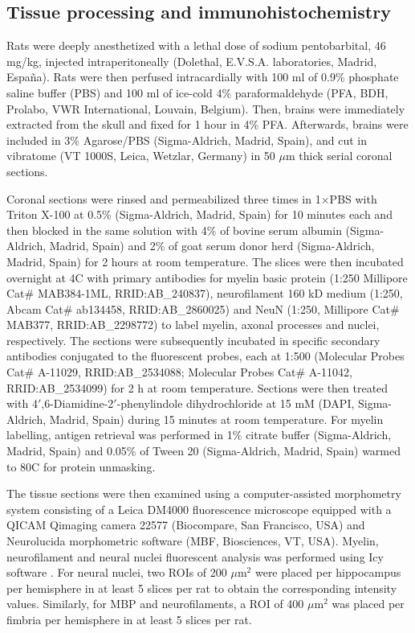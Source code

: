 \documentclass[11pt]{article}
\begin{document}
\subsection{Tissue processing and immunohistochemistry}
Rats were deeply anesthetized with a lethal dose of sodium pentobarbital, 46 mg/kg, injected intraperitoneally (Dolethal, E.V.S.A. laboratories, Madrid, Espa\~na). Rats were then perfused intracardially with 100 ml of 0.9\% phosphate saline buffer (PBS) and 100 ml of ice-cold 4\% paraformaldehyde (PFA, BDH, Prolabo, VWR International, Louvain, Belgium). Then, brains were immediately extracted from the skull and fixed for 1 hour in 4\% PFA. Afterwards, brains were included in 3\% Agarose/PBS (Sigma-Aldrich, Madrid, Spain), and cut in vibratome (VT 1000S, Leica, Wetzlar, Germany) in 50 $\mu$m thick serial coronal sections.

Coronal sections were rinsed and permeabilized three times in 1$\times$PBS with Triton X-100 at 0.5\% (Sigma-Aldrich, Madrid, Spain) for 10 minutes each and then blocked in the same solution with 4\% of bovine serum albumin (Sigma-Aldrich, Madrid, Spain) and 2\% of goat serum donor herd (Sigma-Aldrich, Madrid, Spain) for 2 hours at room temperature. The slices were then incubated overnight at 4\textdegree{}C with primary antibodies for myelin basic protein (1:250 Millipore Cat\# MAB384-1ML, RRID:AB\_240837), neurofilament 160 kD medium (1:250, Abcam Cat\# ab134458, RRID:AB\_2860025) and NeuN (1:250, Millipore Cat\# MAB377, RRID:AB\_2298772) to label myelin, axonal processes and nuclei, respectively. The sections were subsequently incubated in specific secondary antibodies conjugated to the fluorescent probes, each at 1:500 (Molecular Probes Cat\# A-11029, RRID:AB\_2534088; Molecular Probes Cat\# A-11042, RRID:AB\_2534099) for 2 h at room temperature. Sections were then treated with 4$'$,6-Diamidine-2$'$-phenylindole dihydrochloride at 15 mM (DAPI, Sigma-Aldrich, Madrid, Spain) during 15 minutes at room temperature. For myelin labelling, antigen retrieval was performed in 1\% citrate buffer (Sigma-Aldrich, Madrid, Spain) and 0.05\% of Tween 20 (Sigma-Aldrich, Madrid, Spain) warmed to 80\textdegree{}C for protein unmasking.

The tissue sections were then examined using a computer-assisted morphometry system consisting of a Leica DM4000 fluorescence microscope equipped with a QICAM Qimaging camera 22577 (Biocompare, San Francisco, USA) and Neurolucida morphometric software (MBF, Biosciences, VT, USA). Myelin, neurofilament and neural nuclei fluorescent analysis was performed using Icy software \cite{deChaumont2012}. For neural nuclei, two ROIs of 200 $\mu$m$^2$ were placed per hippocampus per hemisphere in at least 5 slices per rat to obtain the corresponding intensity values. Similarly, for MBP and neurofilaments, a ROI of 400 $\mu$m$^2$ was placed per fimbria per hemisphere in at least 5 slices per rat.
\end{document}
